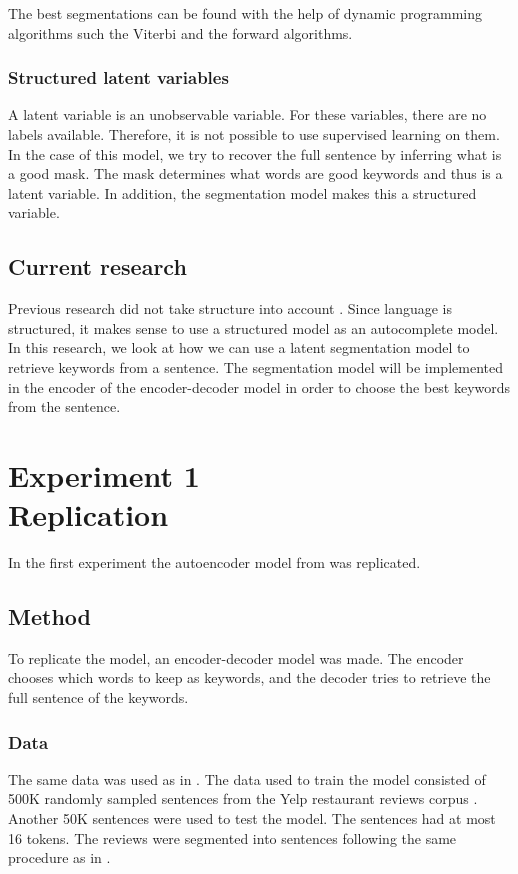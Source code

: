\documentclass[a4paper, 12pt]{report}
\begin{document}
The best segmentations can be found with the help of dynamic programming algorithms such the Viterbi and the forward algorithms. 

\subsection{Structured latent variables}
A latent variable is an unobservable variable.
For these variables, there are no labels available. 
Therefore, it is not possible to use supervised learning on them. 
In the case of this model, we try to recover the full sentence by inferring what is a good mask.
The mask determines what words are good keywords and thus is a latent variable. 
In addition, the segmentation model makes this a structured variable. 


\section{Current research}

Previous research did not take structure into account \cite{autocomplete, Bar-YossefZiv2011Cqa, SvyatkovskiyAlexey2019PACC}.
Since language is structured, it makes sense to use a structured model as an autocomplete model. 
In this research, we look at how we can use a latent segmentation model to retrieve keywords from a sentence. 
The segmentation model will be implemented in the encoder of the encoder-decoder model in order to choose the best keywords from the sentence.

\chapter{Experiment 1 \\ Replication}
\label{ch:repl}
In the first experiment the autoencoder model from  was replicated. 

\section{Method}
To replicate the model, an encoder-decoder model was made. The encoder chooses which words to keep as keywords, and the decoder tries to retrieve the full sentence of the keywords. 

\subsection{Data}
\label{sec:data}
The same data was used as in .
The data used to train the model consisted of 500K randomly sampled sentences from the Yelp restaurant reviews corpus \cite{data}.
Another 50K sentences were used to test the model. 
The sentences had at most 16 tokens. 
The reviews were segmented into sentences following the same procedure as in . 
\end{document}

